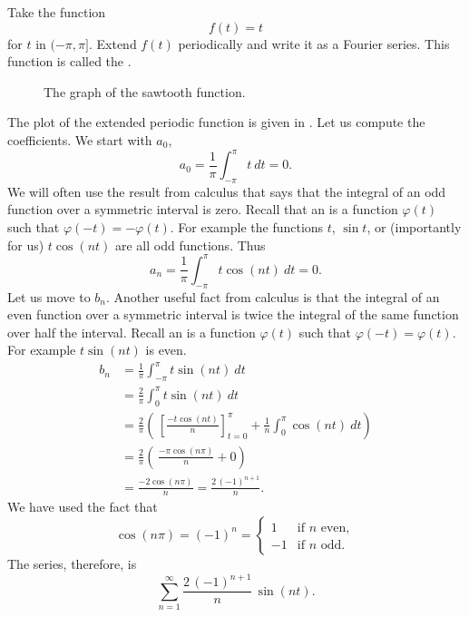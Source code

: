 \begin{example}
Take the function
\begin{equation*}
f(t) = t
\end{equation*}
for $t$ in $(-\pi,\pi]$.  Extend $f(t)$ periodically and write it 
as a Fourier series.  This function is called the \emph{}.

\begin{figure}[h!t]
\capstart
\begin{center}
\caption{The graph of the sawtooth function.\label{ts:sawtoothfig}}
\end{center}
\end{figure}

The plot of the extended periodic function is given in
.
Let us compute the coefficients.  We start with $a_0$,
\begin{equation*}
a_0 = \frac{1}{\pi} \int_{-\pi}^\pi t ~dt = 0 .
\end{equation*}
We will often use the result from calculus that says that the integral of an odd
function over a symmetric interval is zero.  Recall that an
\emph{} is a
function $\varphi(t)$ such that $\varphi(-t) = -\varphi(t)$.  For example
the functions $t$, $\sin t$, or (importantly for us)
$t \cos (nt)$ are all odd functions.  Thus
\begin{equation*}
a_n = \frac{1}{\pi} \int_{-\pi}^\pi t \cos (nt) ~dt = 0 .
\end{equation*}
Let us move to $b_n$.  Another useful fact from calculus
is that the integral of an even function over
a symmetric interval is
twice the integral of the same function over half the interval.  
Recall an \emph{}
is a
function $\varphi(t)$ such that $\varphi(-t) = \varphi(t)$.  For example
$t \sin (nt)$ is even.
\begin{equation*}
\begin{split}
b_n & = \frac{1}{\pi} \int_{-\pi}^\pi t \sin (nt) ~dt \\
& = \frac{2}{\pi} \int_{0}^\pi t \sin (nt) ~dt \\
& = \frac{2}{\pi} \left(
\,
\left[ \frac{-t \cos (nt)}{n} \right]_{t=0}^{\pi}
+
\frac{1}{n}
\int_{0}^\pi \cos (nt) ~dt
\right)
\\
& = \frac{2}{\pi} \left(
\,
\frac{-\pi \cos (n\pi)}{n}
+
0
\right) \\
& =  \frac{-2 \cos (n\pi)}{n}
=  \frac{2 \,{(-1)}^{n+1}}{n} .
\end{split}
\end{equation*}
We have used the fact that 
\begin{equation*}
\cos (n\pi) = {(-1)}^n =
\begin{cases}
1 & \text{if } n \text{ even} , \\
-1 & \text{if } n \text{ odd} .
\end{cases}
\end{equation*}
The series, therefore, is
\begin{equation*}
\sum_{n=1}^\infty
\frac{2 \,{(-1)}^{n+1}}{n} \,
\sin (n t) .
\end{equation*}


\end{example}
